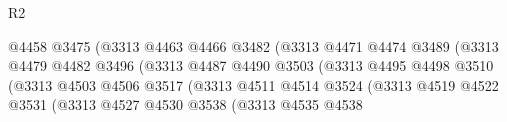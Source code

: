 \begin{lexlean}{R2}
\begin{coremodule}
                                                @4458
                                                @3475
                                                (@3313
                                                  @4463
                                                  @4466
                                                  @3482
                                                  (@3313
                                                    @4471
                                                    @4474
                                                    @3489
                                                    (@3313
                                                      @4479
                                                      @4482
                                                      @3496
                                                      (@3313
                                                        @4487
                                                        @4490
                                                        @3503
                                                        (@3313
                                                          @4495
                                                          @4498
                                                          @3510
                                                          (@3313
                                                            @4503
                                                            @4506
                                                            @3517
                                                            (@3313
                                                              @4511
                                                              @4514
                                                              @3524
                                                              (@3313
                                                                @4519
                                                                @4522
                                                                @3531
                                                                (@3313
                                                                  @4527
                                                                  @4530
                                                                  @3538
                                                                  (@3313
                                                                    @4535
                                                                    @4538

\end{coremodule}
\end{lexlean}
